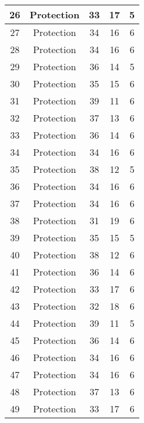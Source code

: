 \documentclass[results.tex]{subfiles}
\begin{document}
\begin{center}
\begin{tabular}{| c || c | c | c | c |}
    \hline
    26 & Protection & 33 & 17 & 5 \\ 
    \hline
    27 & Protection & 34 & 16 & 6 \\ 
    \hline
    28 & Protection & 34 & 16 & 6 \\ 
    \hline
    29 & Protection & 36 & 14 & 5 \\ 
    \hline
    30 & Protection & 35 & 15 & 6 \\ 
    \hline
    31 & Protection & 39 & 11 & 6 \\ 
    \hline
    32 & Protection & 37 & 13 & 6 \\ 
    \hline
    33 & Protection & 36 & 14 & 6 \\ 
    \hline
    34 & Protection & 34 & 16 & 6 \\ 
    \hline
    35 & Protection & 38 & 12 & 5 \\ 
    \hline
    36 & Protection & 34 & 16 & 6 \\ 
    \hline
    37 & Protection & 34 & 16 & 6 \\ 
    \hline
    38 & Protection & 31 & 19 & 6 \\ 
    \hline
    39 & Protection & 35 & 15 & 5 \\ 
    \hline
    40 & Protection & 38 & 12 & 6 \\ 
    \hline
    41 & Protection & 36 & 14 & 6 \\ 
    \hline
    42 & Protection & 33 & 17 & 6 \\ 
    \hline
    43 & Protection & 32 & 18 & 6 \\ 
    \hline
    44 & Protection & 39 & 11 & 5 \\ 
    \hline
    45 & Protection & 36 & 14 & 6 \\ 
    \hline
    46 & Protection & 34 & 16 & 6 \\ 
    \hline
    47 & Protection & 34 & 16 & 6 \\ 
    \hline
    48 & Protection & 37 & 13 & 6 \\ 
    \hline
    49 & Protection & 33 & 17 & 6 \\ 
    \hline   \end{tabular}
\end{center}
\end{document}
